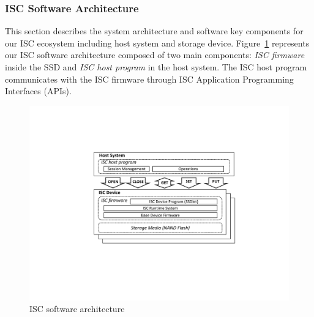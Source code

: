 \subsubsection{ISC Software Architecture}\label{sec:softArch}


This section describes the system architecture and software key components for our ISC ecosystem including host system and storage device. Figure~\ref{fig:SmartSSD_arch} represents our ISC software architecture composed of two main components: \emph{ISC firmware} inside the SSD and \emph{ISC host program} in the host system. The ISC host program communicates with the ISC firmware through ISC Application Programming Interfaces (APIs).




\begin{figure}[tbp]
	\centering
		\includegraphics[width=0.99\columnwidth]{figures/ISC_SW_architecture.pdf}		
	\caption{ISC software architecture}
	\label{fig:SmartSSD_arch}
\end{figure}


